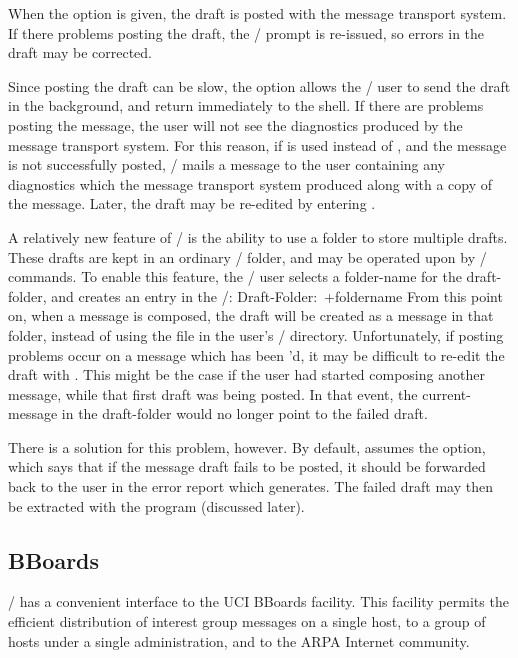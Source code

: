 When the  option is given,
the draft is posted with the message transport system.
If there problems posting the draft,
the \whatnow/ prompt is re-issued,
so errors in the draft may be corrected.

Since posting the draft can be slow,
the  option allows the \MH/ user to send the draft in the
background, and return immediately to the shell.
If there are problems posting the message,
the user will not see the diagnostics produced by
the message transport system.
For this reason,
if  is used instead of ,
and the message is not successfully posted,
\MH/ mails a message to the user
containing any diagnostics which the message transport system produced
along with a copy of the message.
Later,
the draft may be re-edited by entering .

A relatively new feature of \MH/ is the ability to use a folder to store
multiple drafts.
These drafts are kept in an ordinary \MH/ folder,
and may be operated upon by \MH/ commands.
To enable this feature,
the \MH/ user selects a folder-name for the draft-folder,
and creates an entry in the \profile/:
\example Draft-Folder:\ +foldername\endexample
From this point on,
when a message is composed,
the draft will be created as a message in that folder,
instead of using the  file in the user's \MH/ directory.
Unfortunately,
if posting problems occur on a message which has been 'd,
it may be difficult to re-edit the draft with
.
This might be the case if the user had started composing another message,
while that first draft was being posted.
In that event,
the current-message in the draft-folder would no longer point
to the failed draft.

There is a solution for this problem, however.
By default,
 assumes the  option,
which says that if the message draft fails to be posted,
it should be forwarded back to the user in the
error report which  generates.
The failed draft may then be extracted with the  program
(discussed later).

\subsection{BBoards}				%
\MH/ has a convenient interface to the UCI BBoards facility\cite{MRose84a}.%
This facility permits the efficient distribution of interest group messages
on a single host,
to a group of hosts under a single administration,
and to the ARPA Internet community.

